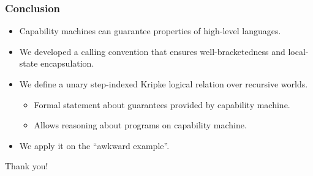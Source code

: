 \documentclass{beamer}
\begin{document}

\begin{frame}
  \frametitle{Conclusion}
  \begin{itemize}[<+->]
  \item Capability machines can guarantee properties of high-level languages.
  \item We developed a calling convention that ensures well-bracketedness and local-state encapsulation.
  \item We define a unary step-indexed Kripke logical relation over recursive worlds.
    \begin{itemize}
    \item Formal statement about guarantees provided by capability machine.
    \item Allows reasoning about programs on capability machine.
    \end{itemize}
  \item We apply it on the ``awkward example''.
  \end{itemize}
\end{frame}

\begin{frame}
  \centering
  Thank you!
\end{frame}
\end{document}
